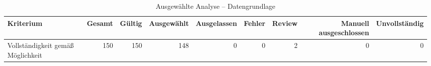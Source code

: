 \begin{table}[htbp]
\centering
\caption{Ausgewählte Analyse -- Datengrundlage}
\begin{tabular}{lrrrrrrrr}
\toprule
Kriterium & Gesamt & Gültig & Ausgewählt & Ausgelassen & Fehler & Review & Manuell ausgeschlossen & Unvollständig \\
\midrule
Vollständigkeit gemäß Möglichkeit & 150 & 150 & 148 & 0 & 0 & 2 & 0 & 0 \\
\bottomrule
\end{tabular}
\end{table}
